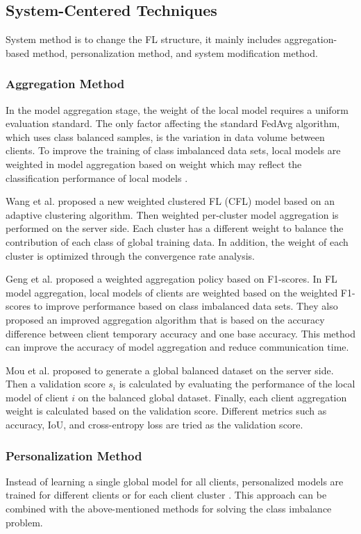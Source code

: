 \documentclass[10pt,journal,compsoc]{IEEEtran}
\begin{document}
	\subsection{System-Centered Techniques}
	System method is to change the FL structure, it mainly includes aggregation-based method,  personalization method, and system modification method.
	\subsubsection{Aggregation Method}
	In the model aggregation stage, the weight of the local model requires a uniform evaluation standard. The only factor affecting the standard FedAvg algorithm, which uses class balanced samples, is the variation in data volume between clients. To improve the training of class imbalanced data sets, local models are weighted in model aggregation based on weight which may reflect the classification performance of local models \cite{geng2022bearing}. 
	
	Wang et al. \cite{wang2021adaptive} proposed a new weighted clustered FL (CFL) model based on an adaptive clustering algorithm. Then weighted per-cluster model aggregation is performed on the server side. Each cluster has a different weight to balance the contribution of each class of global training data. In addition, the weight of each cluster is optimized through the convergence rate analysis. 
	
	Geng et al. \cite{geng2022bearing} proposed a weighted aggregation policy based on F1-scores. In FL model aggregation, local models of clients are weighted based on the weighted F1-scores to improve performance based on class imbalanced data sets. They also proposed an improved aggregation algorithm that is based on the accuracy difference between client temporary accuracy and one base accuracy. This method can improve the accuracy of model aggregation and reduce communication time. %
	
	Mou et al.  \cite{mou2021optimized} proposed to generate a global balanced dataset on the server side. Then a validation score $ s_{i} $ is calculated by evaluating the performance of the local model of client $ i $ on the balanced global dataset. Finally, each client aggregation weight is calculated based on the validation score. Different metrics such as accuracy, IoU, and cross-entropy loss are tried as the validation score. 
	
	\subsubsection{Personalization Method}
	Instead of learning a single global model for all clients, personalized models are trained for different clients or for each client cluster \cite{kairouz2021advances}.  This approach can be combined with the above-mentioned methods for solving the class imbalance problem.
	
\end{document}
